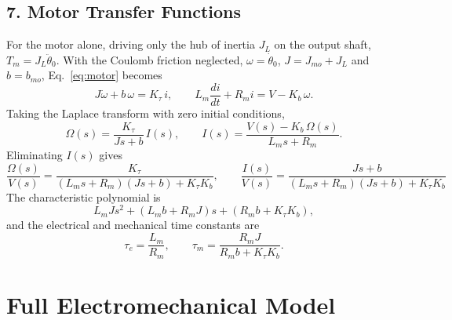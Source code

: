 \documentclass[a4paper,11pt]{article}
\begin{document}
\subsection{7. Motor Transfer Functions}
For the motor alone, driving only the hub of inertia $J_L$ on the output shaft, $T_m = J_L \ddot\theta_0$. With the Coulomb friction neglected, $\omega = \dot\theta_0$, $J = J_{mo} + J_L$ and $b = b_{mo}$, Eq.~\eqref{eq:motor} becomes
\begin{equation}
  J \dot\omega + b\, \omega = K_\tau\, i, \qquad L_m \frac{di}{dt} + R_m i = V - K_b\, \omega .
\end{equation}
Taking the Laplace transform with zero initial conditions,
\begin{equation}
  \Omega(s) = \frac{K_\tau}{J s + b}\, I(s), \qquad I(s) = \frac{V(s) - K_b\, \Omega(s)}{L_m s + R_m} .
\end{equation}
Eliminating $I(s)$ gives
\begin{equation}
\boxed{
  \frac{\Omega(s)}{V(s)} = \frac{K_\tau}{(L_m s + R_m)(J s + b) + K_\tau K_b}, \qquad
  \frac{I(s)}{V(s)} = \frac{J s + b}{(L_m s + R_m)(J s + b) + K_\tau K_b}
}
\label{eq:motorTF}
\end{equation}
The characteristic polynomial is
\begin{equation}
  L_m J s^2 + \left(L_m b + R_m J\right)s + \left(R_m b + K_\tau K_b\right) ,
\end{equation}
and the electrical and mechanical time constants are
\begin{equation}
  \tau_e = \frac{L_m}{R_m}, \qquad \tau_m = \frac{R_m J}{R_m b + K_\tau K_b} .
  \label{eq:taus}
\end{equation}

\section{Full Electromechanical Model}
\label{sec:full}
\end{document}
